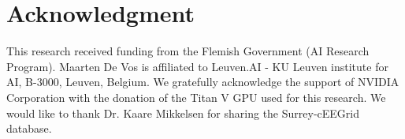\documentclass[journal,twoside,web]{ieeecolor}
\begin{document}
\vspace{-0.25cm}
\section*{Acknowledgment}
\vspace{-0.1cm}
This research received funding from the Flemish Government (AI Research Program). Maarten De Vos is affiliated to Leuven.AI - KU Leuven institute for AI, B-3000, Leuven, Belgium. We gratefully acknowledge the support of NVIDIA Corporation with the donation of the Titan V GPU used for this research. We would like to thank Dr. Kaare Mikkelsen for sharing the Surrey-cEEGrid database.



\vspace{-0.35cm}


\end{document}

